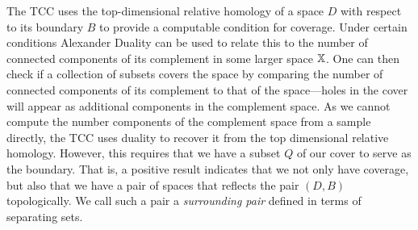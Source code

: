 

The TCC uses the top-dimensional relative homology of a space $D$ with respect to its boundary $B$ to provide a computable condition for coverage.
Under certain conditions Alexander Duality can be used to relate this to the number of connected components of its complement in some larger space $\mathbb{X}$.
One can then check if a collection of subsets covers the space by comparing the number of connected components of its complement to that of the space---holes in the cover will appear as additional components in the complement space.
As we cannot compute the number components of the complement space from a sample directly, the TCC uses duality to recover it from the top dimensional relative homology.
However, this requires that we have a subset $Q$ of our cover to serve as the boundary.
That is, a positive result indicates that we not only have coverage, but also that we have a pair of spaces that reflects the pair $(D, B)$ topologically.
We call such a pair a \emph{surrounding pair} defined in terms of separating sets.

